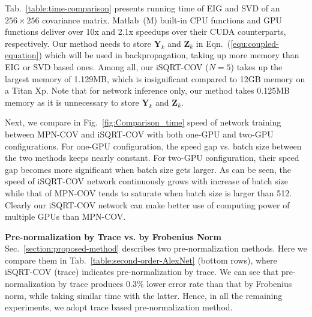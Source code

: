\documentclass[10pt,twocolumn,letterpaper]{article}
\begin{document}
Tab.~\ref{table:time-comparison}
presents  running time  of EIG and SVD of an $256\times 256$ covariance matrix.   Matlab~(M) built-in CPU functions and GPU functions deliver over 10x and 2.1x  speedups over their CUDA counterparts, respectively.  Our method needs to store $\mathbf{Y}_{k}$ and $\mathbf{Z}_{k}$ in Eqn.~(\ref{equ:coupled-equation}) which will be used in backpropagation, taking up more memory than EIG or SVD based ones. Among all,  our iSQRT-COV ($N=5$) takes up the largest memory of 1.129MB, which is insignificant compared to 12GB memory on a Titan Xp. Note that for network inference only, our method  takes  0.125MB memory as it is unnecessary to store  $\mathbf{Y}_{k}$ and $\mathbf{Z}_{k}$.


Next, we compare in  Fig.~\ref{fig:Comparison_time} speed  of network training between MPN-COV and iSQRT-COV with both one-GPU and two-GPU configurations. For one-GPU configuration, the speed gap vs. batch size between the two methods keeps nearly constant. For two-GPU configuration, their speed gap becomes more significant when  batch size gets larger. As can be seen, the  speed of iSQRT-COV network continuously grows with increase of batch size while that of MPN-COV tends to saturate when batch size is larger than 512. Clearly our iSQRT-COV network can make better use of computing power of multiple GPUs than MPN-COV.


\vspace{4pt}\noindent\textbf{Pre-normalization by Trace vs. by Frobenius Norm}\quad 
Sec.~\ref{section:proposed-method} describes two pre-normalization methods. Here we compare them in Tab.~\ref{table:second-order-AlexNet} (bottom rows), where iSQRT-COV (trace) indicates pre-normalization by trace. We can see that pre-normalization by trace produces 0.3\% lower error rate than that by Frobenius norm, while taking similar time with the latter. Hence, in all the remaining experiments, we adopt trace based pre-normalization method.
\end{document}

